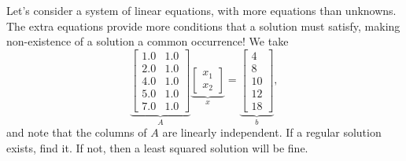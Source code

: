\begin{example}
\label{ex:LeastSqauredLinearEquations}
Let's consider a system of linear equations, with more equations than unknowns. The extra equations provide more conditions that a solution must satisfy, making non-existence of a solution a common occurrence! We take
\begin{equation}
\label{eq:LeastSquareSolExample}
\underbrace{\left[\begin{array}{rrr}
 1.0 & 1.0 \\
 2.0 & 1.0 \\
 4.0 & 1.0 \\
 5.0 & 1.0 \\
 7.0  & 1.0
 \end{array}\right]}_{A} \underbrace{\left[\begin{array}{c}
x_1 \\ x_2  \end{array}\right]}_{x} =  \underbrace{\left[\begin{array}{r}
4 \\  8 \\ 10 \\ 12 \\ 18 \end{array}\right]}_{b},
\end{equation}
and note that the columns of $A$ are linearly independent. If a regular solution exists, find it. If not, then a least squared solution will be fine.
\end{example}

